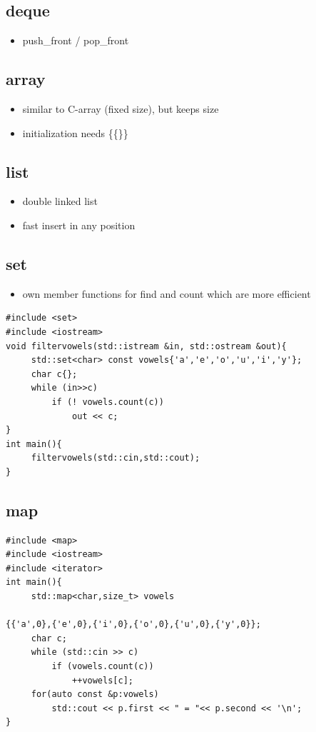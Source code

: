 \subsection{deque}
\begin{itemize}
\item push\_front / pop\_front
\end{itemize}

\subsection{array}
\begin{itemize}
\item similar to C-array (fixed size), but keeps size
\item initialization needs \{\{\}\}
\end{itemize}

\subsection{list}
\begin{itemize}
\item double linked list
\item fast insert in any position
\end{itemize}

\subsection{set}
\begin{itemize}
\item own member functions for find and count which are more efficient
\end{itemize}
\begin{lstlisting}
#include <set>
#include <iostream>
void filtervowels(std::istream &in, std::ostream &out){
	 std::set<char> const vowels{'a','e','o','u','i','y'};
	 char c{};
	 while (in>>c)
	 	 if (! vowels.count(c))
	 	 	 out << c;
}
int main(){
	 filtervowels(std::cin,std::cout);
}
\end{lstlisting}

\subsection{map}
\begin{lstlisting}
#include <map>
#include <iostream>
#include <iterator>
int main(){
	 std::map<char,size_t> vowels
	
{{'a',0},{'e',0},{'i',0},{'o',0},{'u',0},{'y',0}};
	 char c;
	 while (std::cin >> c)
	 	 if (vowels.count(c))
	 	 	 ++vowels[c];
	 for(auto const &p:vowels)
	 	 std::cout << p.first << " = "<< p.second << '\n';
}
\end{lstlisting}
